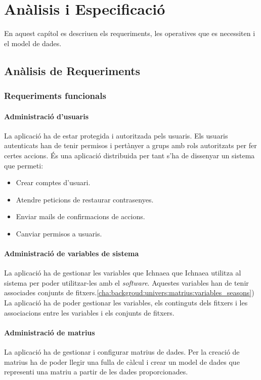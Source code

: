 \chapter{An\`{a}lisis i Especificaci\'{o}}
\label{cha:specification}
En aquest cap\'{i}tol es descriuen els requeriments, les operatives que es necessiten i el model de dades.

\section{An\`{a}lisis de Requeriments}

\subsection{Requeriments funcionals}
\subsubsection{Administraci\'{o} d'usuaris}
La aplicaci\'{o} ha de estar protegida i autoritzada pels usuaris. Els usuaris autenticats han de tenir permisos i  pertànyer a grups amb rols autoritzats per fer certes accions. \'{E}s una aplicaci\'{o} distribuida per tant s'ha de dissenyar un sistema que permeti:
\begin{itemize}
\item Crear comptes d'usuari.
\item Atendre peticions de restaurar contrasenyes.
\item Enviar mails de confirmacions de accions.
\item Canviar permisos a usuaris.
\end{itemize}

\subsubsection{Administraci\'{o} de variables de sistema}
La aplicaci\'{o} ha de gestionar les variables que Ichnaea que Ichnaea utilitza al sistema per poder utilitzar-les amb el \textit{software}. Aquestes variables han de tenir associades conjunts de fitxers.\ref{cha:backgroud:univers:matrius:variables_seasons}) La aplicaci\'{o} ha de poder gestionar les variables, els continguts dels fitxers i les associacions entre les variables i els conjunts de fitxers.

\subsubsection{Administraci\'{o} de matrius}
La aplicaci\'{o} ha de gestionar i configurar matrius de dades. Per la creaci\'{o} de matrius ha de poder llegir una fulla de c\`{a}lcul i crear un model de dades que representi una matriu a partir de les dades proporcionades.\\

